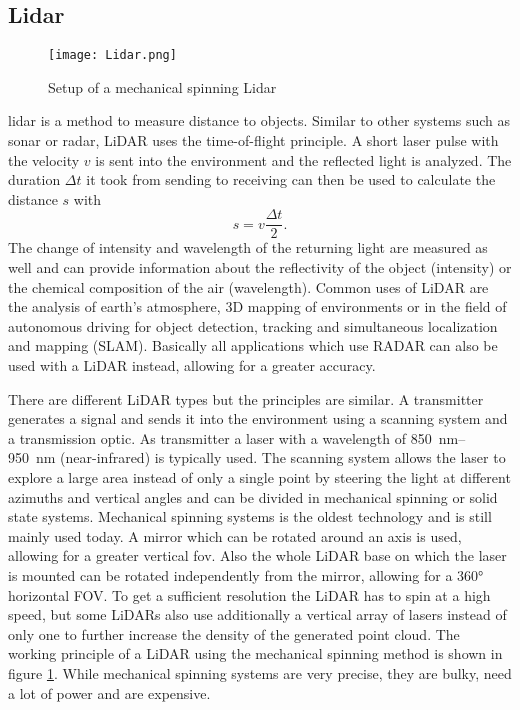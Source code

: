 
\subsection{Lidar}
\begin{figure}[htb]
	\centering
	\texttt{[image: Lidar.png]}
	\caption{Setup of a mechanical spinning Lidar \cite{Li2020}}
	\label{fig:lidar}
\end{figure}
\gls{lidar} is a method to measure distance to objects.
Similar to other systems such as \gls{sonar} or \gls{radar}, LiDAR uses the time-of-flight principle.
A short laser pulse with the velocity $v$ is sent into the environment and the reflected light is analyzed.
The duration $\Delta t$ it took from sending to receiving can then be used to calculate the distance $s$ with
\[ s = v\frac{\Delta t}{2}. \]
The change of intensity and wavelength of the returning light are measured as well and can provide information about the reflectivity of the object (intensity) or the chemical composition of the air (wavelength).
Common uses of LiDAR are the analysis of earth's atmosphere, 3D mapping of environments or in the field of autonomous driving for object detection, tracking and simultaneous localization and mapping (SLAM).
Basically all applications which use RADAR can also be used with a LiDAR instead, allowing for a greater accuracy.

There are different LiDAR types but the principles are similar.
A transmitter generates a signal and sends it into the environment using a scanning system and a transmission optic.
As transmitter a laser with a wavelength of \SIrange{850}{950}{\nano\metre} (near-infrared) is typically used.
The scanning system allows the laser to explore a large area instead of only a single point by steering the light at different azimuths and vertical angles and can be divided in mechanical spinning or solid state systems.
Mechanical spinning systems is the oldest technology and is still mainly used today.
A mirror which can be rotated around an axis is used, allowing for a greater vertical \gls{fov}.
Also the whole LiDAR base on which the laser is mounted can be rotated independently from the mirror, allowing for a 360° horizontal FOV.
To get a sufficient resolution the LiDAR has to spin at a high speed, but some LiDARs also use additionally a vertical array of lasers instead of only one to further increase the density of the generated point cloud.
The working principle of a LiDAR using the mechanical spinning method is shown in figure \ref{fig:lidar}.
While mechanical spinning systems are very precise, they are bulky, need a lot of power and are expensive.

